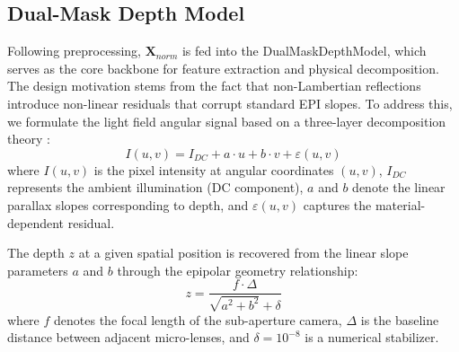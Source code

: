 \documentclass[lettersize,journal]{IEEEtran}
\begin{document}
\subsection{Dual-Mask Depth Model}

Following preprocessing, $\mathbf{X}_{norm}$ is fed into the DualMaskDepthModel, which serves as the core backbone for feature extraction and physical decomposition. The design motivation stems from the fact that non-Lambertian reflections introduce non-linear residuals that corrupt standard EPI slopes. To address this, we formulate the light field angular signal based on a three-layer decomposition theory \cite{ng2005}:
\begin{equation}
I(u,v) = I_{DC} + a \cdot u + b \cdot v + \varepsilon(u,v)
\end{equation}
where $I(u,v)$ is the pixel intensity at angular coordinates $(u,v)$, $I_{DC}$ represents the ambient illumination (DC component), $a$ and $b$ denote the linear parallax slopes corresponding to depth, and $\varepsilon(u,v)$ captures the material-dependent residual.

The depth $z$ at a given spatial position is recovered from the linear slope parameters $a$ and $b$ through the epipolar geometry relationship:
\begin{equation}
z = \frac{f \cdot \Delta}{\sqrt{a^2 + b^2} + \delta}
\end{equation}
where $f$ denotes the focal length of the sub-aperture camera, $\Delta$ is the baseline distance between adjacent micro-lenses, and $\delta = 10^{-8}$ is a numerical stabilizer.
\end{document}
